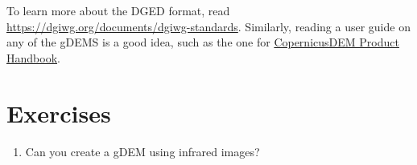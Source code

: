 To learn more about the DGED format, read \url{https://dgiwg.org/documents/dgiwg-standards}.
Similarly, reading a user guide on any of the gDEMS is a good idea, such as the one for \href{https://spacedata.copernicus.eu/documents/20126/0/GEO1988-CopernicusDEM-SPE-002_ProductHandbook_I3.0+%281%29.pdf}{CopernicusDEM Product Handbook}.



%
\section{Exercises}

\begin{enumerate}
  \item Can you create a gDEM using infrared images?
\end{enumerate}

